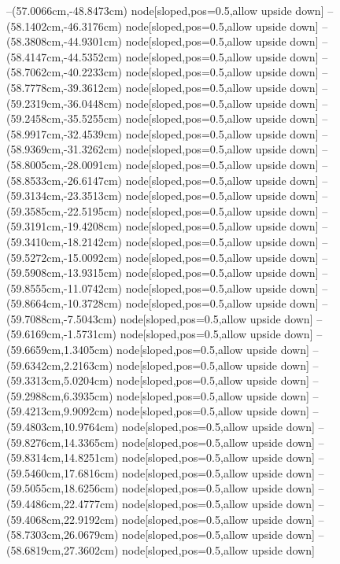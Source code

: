 --(57.0066cm,-48.8473cm) node[sloped,pos=0.5,allow upside down]{\ArrowIn}
--(58.1402cm,-46.3176cm) node[sloped,pos=0.5,allow upside down]{\ArrowIn}
--(58.3808cm,-44.9301cm) node[sloped,pos=0.5,allow upside down]{\ArrowIn}
--(58.4147cm,-44.5352cm) node[sloped,pos=0.5,allow upside down]{\arrowIn}
--(58.7062cm,-40.2233cm) node[sloped,pos=0.5,allow upside down]{\ArrowIn}
--(58.7778cm,-39.3612cm) node[sloped,pos=0.5,allow upside down]{\arrowIn}
--(59.2319cm,-36.0448cm) node[sloped,pos=0.5,allow upside down]{\ArrowIn}
--(59.2458cm,-35.5255cm) node[sloped,pos=0.5,allow upside down]{\arrowIn}
--(58.9917cm,-32.4539cm) node[sloped,pos=0.5,allow upside down]{\ArrowIn}
--(58.9369cm,-31.3262cm) node[sloped,pos=0.5,allow upside down]{\ArrowIn}
--(58.8005cm,-28.0091cm) node[sloped,pos=0.5,allow upside down]{\ArrowIn}
--(58.8533cm,-26.6147cm) node[sloped,pos=0.5,allow upside down]{\ArrowIn}
--(59.3134cm,-23.3513cm) node[sloped,pos=0.5,allow upside down]{\ArrowIn}
--(59.3585cm,-22.5195cm) node[sloped,pos=0.5,allow upside down]{\arrowIn}
--(59.3191cm,-19.4208cm) node[sloped,pos=0.5,allow upside down]{\ArrowIn}
--(59.3410cm,-18.2142cm) node[sloped,pos=0.5,allow upside down]{\ArrowIn}
--(59.5272cm,-15.0092cm) node[sloped,pos=0.5,allow upside down]{\ArrowIn}
--(59.5908cm,-13.9315cm) node[sloped,pos=0.5,allow upside down]{\ArrowIn}
--(59.8555cm,-11.0742cm) node[sloped,pos=0.5,allow upside down]{\ArrowIn}
--(59.8664cm,-10.3728cm) node[sloped,pos=0.5,allow upside down]{\arrowIn}
--(59.7088cm,-7.5043cm) node[sloped,pos=0.5,allow upside down]{\ArrowIn}
--(59.6169cm,-1.5731cm) node[sloped,pos=0.5,allow upside down]{\ArrowIn}
--(59.6659cm,1.3405cm) node[sloped,pos=0.5,allow upside down]{\ArrowIn}
--(59.6342cm,2.2163cm) node[sloped,pos=0.5,allow upside down]{\arrowIn}
--(59.3313cm,5.0204cm) node[sloped,pos=0.5,allow upside down]{\ArrowIn}
--(59.2988cm,6.3935cm) node[sloped,pos=0.5,allow upside down]{\ArrowIn}
--(59.4213cm,9.9092cm) node[sloped,pos=0.5,allow upside down]{\ArrowIn}
--(59.4803cm,10.9764cm) node[sloped,pos=0.5,allow upside down]{\ArrowIn}
--(59.8276cm,14.3365cm) node[sloped,pos=0.5,allow upside down]{\ArrowIn}
--(59.8314cm,14.8251cm) node[sloped,pos=0.5,allow upside down]{\arrowIn}
--(59.5460cm,17.6816cm) node[sloped,pos=0.5,allow upside down]{\ArrowIn}
--(59.5055cm,18.6256cm) node[sloped,pos=0.5,allow upside down]{\arrowIn}
--(59.4486cm,22.4777cm) node[sloped,pos=0.5,allow upside down]{\ArrowIn}
--(59.4068cm,22.9192cm) node[sloped,pos=0.5,allow upside down]{\arrowIn}
--(58.7303cm,26.0679cm) node[sloped,pos=0.5,allow upside down]{\ArrowIn}
--(58.6819cm,27.3602cm) node[sloped,pos=0.5,allow upside down]{\ArrowIn}
